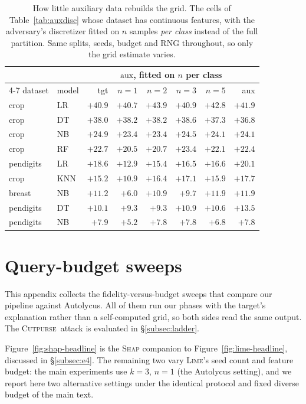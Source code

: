 \documentclass[sigconf,anonymous,review]{acmart}
\newcommand{\sys}{\textsc{Cutpurse}}
\begin{document}
\begin{table}[t]
\centering
\setlength{\tabcolsep}{4pt}
\caption{How little auxiliary data rebuilds the grid. The cells of Table~\ref{tab:auxdisc} whose
dataset has continuous features, with the adversary's discretizer fitted on $n$ samples \emph{per
class} instead of the full partition. Same splits, seeds, budget and RNG throughout, so only the
grid estimate varies.}
\label{tab:auxsize}
\begin{tabular}{llrrrrrr}
\toprule
 & & & \multicolumn{4}{c}{$\text{aux}$, fitted on $n$ per class} & \\
\cmidrule(lr){4-7}
dataset & model & tgt & $n{=}1$ & $n{=}2$ & $n{=}3$ & $n{=}5$ & aux \\
\midrule
crop      & LR  & $+40.9$ & $+40.7$ & $+43.9$ & $+40.9$ & $+42.8$ & $+41.9$ \\
crop      & DT  & $+38.0$ & $+38.2$ & $+38.2$ & $+38.6$ & $+37.3$ & $+36.8$ \\
crop      & NB  & $+24.9$ & $+23.4$ & $+23.4$ & $+24.5$ & $+24.1$ & $+24.1$ \\
crop      & RF  & $+22.7$ & $+20.5$ & $+20.7$ & $+23.4$ & $+22.1$ & $+22.4$ \\
pendigits & LR  & $+18.6$ & $+12.9$ & $+15.4$ & $+16.5$ & $+16.6$ & $+20.1$ \\
crop      & KNN & $+15.2$ & $+10.9$ & $+16.4$ & $+17.1$ & $+15.9$ & $+17.7$ \\
breast    & NB  & $+11.2$ & $+6.0$  & $+10.9$ & $+9.7$  & $+11.9$ & $+11.9$ \\
pendigits & DT  & $+10.1$ & $+9.3$  & $+9.3$  & $+10.9$ & $+10.6$ & $+13.5$ \\
pendigits & NB  & $+7.9$  & $+5.2$  & $+7.8$  & $+7.8$  & $+6.8$  & $+7.8$ \\
\bottomrule
\end{tabular}
\end{table}

\section{Query-budget sweeps}
\label{app:sweeps}
\label{app:robustness}
This appendix collects the fidelity-versus-budget sweeps that compare our pipeline against Autolycus.
All of them run our phases with the target's explanation rather than a self-computed grid, so both
sides read the same output. The \sys\ attack is evaluated in \S\ref{subsec:ladder}.

Figure~\ref{fig:shap-headline} is the \textsc{Shap} companion to Figure~\ref{fig:lime-headline},
discussed in \S\ref{subsec:e4}. The remaining two vary \textsc{Lime}'s seed count and feature budget:
the main experiments use $k{=}3$, $n{=}1$ (the Autolycus setting), and we report here two alternative
settings under the identical protocol and fixed diverse budget of the main text.
\end{document}

